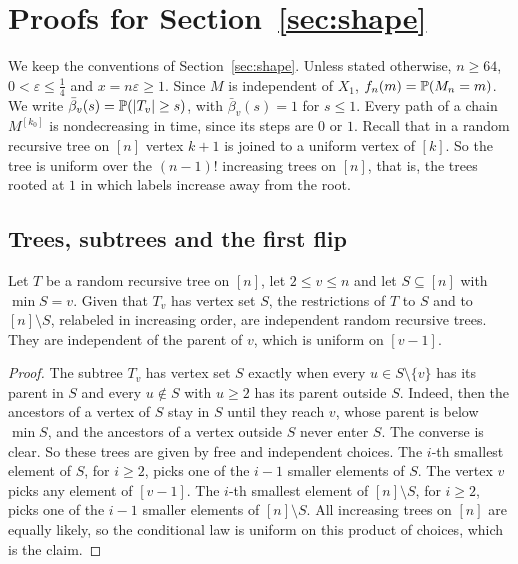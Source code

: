 \section{Proofs for \texorpdfstring{Section~\ref{sec:shape}}{Section 3}}\label{app:shape}

We keep the conventions of Section~\ref{sec:shape}. Unless stated
otherwise, $n\ge64$, $0<\varepsilon\le\frac14$ and $x=n\varepsilon\ge1$.
Since $M$ is independent of $X_1$, $f_n(m)=\mathbb{P}(M_n=m)$. We write
$\bar\beta_v(s)=\mathbb{P}(\lvert T_v\rvert\ge s)$, with $\bar\beta_v(s)=1$ for
$s\le1$. Every path of a chain $M^{[k_0]}$ is nondecreasing in time, since
its steps are $0$ or $1$. Recall that in a random recursive tree on $[n]$
vertex $k+1$ is joined to a uniform vertex of $[k]$. So the tree is uniform
over the $(n-1)!$ increasing trees on $[n]$, that is, the trees rooted at
$1$ in which labels increase away from the root.

\subsection{Trees, subtrees and the first flip}\label{app:shape-trees}

\begin{lemma}[splitting]\label{lem:B-split}
Let $T$ be a random recursive tree on $[n]$, let $2\le v\le n$ and let
$S\subseteq[n]$ with $\min S=v$. Given that $T_v$ has vertex set $S$, the
restrictions of $T$ to $S$ and to $[n]\setminus S$, relabeled in
increasing order, are independent random recursive trees. They are
independent of the parent of $v$, which is uniform on $[v-1]$.
\end{lemma}

\begin{proof}
The subtree $T_v$ has vertex set $S$ exactly when every $u\in S\setminus\{v\}$
has its parent in $S$ and every $u\notin S$ with $u\ge2$ has its parent
outside $S$. Indeed, then the ancestors of a vertex of $S$ stay in $S$ until
they reach $v$, whose parent is below $\min S$, and the ancestors of a
vertex outside $S$ never enter $S$. The converse is clear. So these trees
are given by free and independent choices. The $i$-th smallest element of
$S$, for $i\ge2$, picks one of the $i-1$ smaller elements of $S$. The vertex
$v$ picks any element of $[v-1]$. The $i$-th smallest element of
$[n]\setminus S$, for $i\ge2$, picks one of the $i-1$ smaller elements of
$[n]\setminus S$. All increasing trees on $[n]$ are equally likely, so the
conditional law is uniform on this product of choices, which is the claim.
\end{proof}

